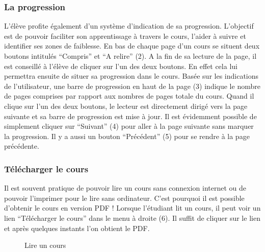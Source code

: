 \documentclass[a4paper,10pt,twoside]{sphinxmanual}
\begin{document}
\subsubsection{La progression}
\label{functionalities:la-progression}
L'élève profite également d'un système d'indication de sa progression. L'objectif est de pouvoir faciliter son apprentissage à travers le cours, l'aider à suivre et identifier ses zones de faiblesse. En bas de chaque page d'un cours se situent deux boutons intitulés ``Compris'' et ``A relire'' (2). A la fin de sa lecture de la page, il est conseillé à l'élève de cliquer sur l'un des deux boutons. En effet cela lui permettra ensuite de situer sa progression dans le cours. Basée sur les indications de l'utilisateur, une barre de progression en haut de la page (3) indique le nombre de pages comprises par rapport aux nombres de pages totale du cours. Quand il clique sur l'un des deux boutons, le lecteur est directement dirigé vers la page suivante et sa barre de progression est mise à jour. Il est évidemment possible de simplement cliquer sur ``Suivant'' (4) pour aller à la page suivante sans marquer la progression. Il y a aussi un bouton ``Précédent'' (5) pour se rendre à la page précédente.


\subsubsection{Télécharger le cours}
\label{functionalities:telecharger-le-cours}
Il est souvent pratique de pouvoir lire un cours sans connexion internet ou de pouvoir l'imprimer pour le lire sans ordinateur. C'est pourquoi il est possible d'obtenir le cours en version PDF ! Lorsque l'étudiant lit un cours, il peut voir un lien ``Télécharger le cours'' dans le menu à droite (6). Il suffit de cliquer sur le lien et après quelques instants l'on obtient le PDF.
\begin{figure}[htbp]
\centering
\capstart

\caption{Lire un cours}\end{figure}
\end{document}
